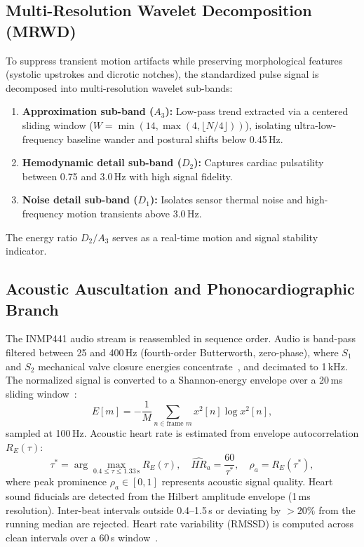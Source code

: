 \documentclass[journal]{IEEEtran}
\newcommand{\HR}{\mathit{HR}}
\begin{document}
\subsection{Multi-Resolution Wavelet Decomposition (MRWD)}
To suppress transient motion artifacts while preserving morphological features (systolic upstrokes and dicrotic notches), the standardized pulse signal is decomposed into multi-resolution wavelet sub-bands:
\begin{enumerate}
  \item \textbf{Approximation sub-band ($A_3$):} Low-pass trend extracted via a centered sliding window ($W = \min(14, \max(4, \lfloor N/4 \rfloor))$), isolating ultra-low-frequency baseline wander and postural shifts below 0.45\,Hz.
  \item \textbf{Hemodynamic detail sub-band ($D_2$):} Captures cardiac pulsatility between 0.75 and 3.0\,Hz with high signal fidelity.
  \item \textbf{Noise detail sub-band ($D_1$):} Isolates sensor thermal noise and high-frequency motion transients above 3.0\,Hz.
\end{enumerate}
The energy ratio $D_2/A_3$ serves as a real-time motion and signal stability indicator.

\subsection{Acoustic Auscultation and Phonocardiographic Branch}
\label{sec:pcg}
The INMP441 audio stream is reassembled in sequence order. Audio is band-pass filtered between 25 and 400\,Hz (fourth-order Butterworth, zero-phase), where $S_1$ and $S_2$ mechanical valve closure energies concentrate~\cite{springer2016hsmm}, and decimated to 1\,kHz. The normalized signal is converted to a Shannon-energy envelope over a 20\,ms sliding window~\cite{liang1997envelogram}:
\begin{equation}
  E[m] = -\frac{1}{M}\sum_{n\in\text{frame }m} x^2[n]\log x^2[n],
  \label{eq:shannon}
\end{equation}
sampled at 100\,Hz. Acoustic heart rate is estimated from envelope autocorrelation $R_E(\tau)$:
\begin{equation}
  \tau^* = \arg\max_{0.4 \le \tau \le 1.33\,\mathrm{s}} R_E(\tau),\quad
  \widehat{\HR}_a = \frac{60}{\tau^*},\quad \rho_a = R_E(\tau^*),
  \label{eq:acf}
\end{equation}
where peak prominence $\rho_a \in [0, 1]$ represents acoustic signal quality. Heart sound fiducials are detected from the Hilbert amplitude envelope (1\,ms resolution). Inter-beat intervals outside 0.4--1.5\,s or deviating by $>20\%$ from the running median are rejected. Heart rate variability (RMSSD) is computed across clean intervals over a 60\,s window~\cite{taskforce1996hrv}.
\end{document}
